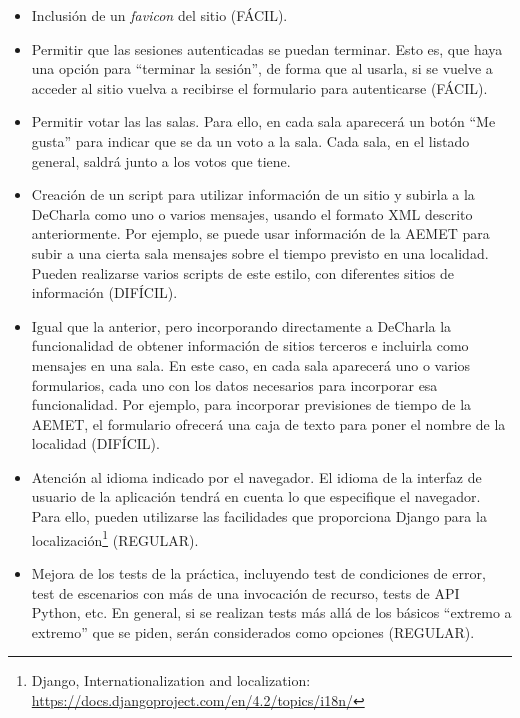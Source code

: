 \begin{itemize}
  \item Inclusión de un \emph{favicon} del sitio (FÁCIL).

  \item Permitir que las sesiones autenticadas se puedan terminar. Esto es, que haya una opción para ``terminar la sesión'', de forma que al usarla, si se vuelve a acceder al sitio vuelva a recibirse el formulario para autenticarse (FÁCIL).

  \item Permitir votar las las salas. Para ello, en cada sala aparecerá un botón ``Me gusta'' para indicar que se da un voto a la sala. Cada sala, en el listado general, saldrá junto a los votos que tiene.

  \item Creación de un script para utilizar información de un sitio y subirla a la DeCharla como uno o varios mensajes, usando el formato XML descrito anteriormente. Por ejemplo, se puede usar información de la AEMET para subir a una cierta sala mensajes sobre el tiempo previsto en una localidad. Pueden realizarse varios scripts de este estilo, con diferentes sitios de información (DIFÍCIL).

  \item Igual que la anterior, pero incorporando directamente a DeCharla la funcionalidad de obtener información de sitios terceros e incluirla como mensajes en una sala. En este caso, en cada sala aparecerá uno o varios formularios, cada uno con los datos necesarios para incorporar esa funcionalidad. Por ejemplo, para incorporar previsiones de tiempo de la AEMET, el formulario ofrecerá una caja de texto para poner el nombre de la localidad (DIFÍCIL).
        
  \item Atención al idioma indicado por el navegador. El idioma de la interfaz de usuario de la aplicación tendrá en cuenta lo que especifique el navegador. Para ello, pueden utilizarse las facilidades que proporciona Django para la localización\footnote{Django, Internationalization and localization: \\ \url{https://docs.djangoproject.com/en/4.2/topics/i18n/} } (REGULAR).
    
  \item Mejora de los tests de la práctica, incluyendo test de condiciones de error, test de escenarios con más de una invocación de recurso, tests de API Python, etc. En general, si se realizan tests más allá de los básicos ``extremo a extremo'' que se piden, serán considerados como opciones (REGULAR).
\end{itemize}

